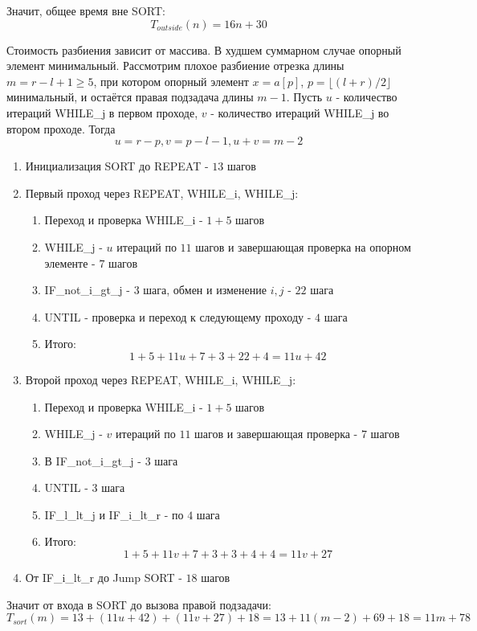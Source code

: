 \documentclass[12pt]{article}
\begin{document}
Значит, общее время вне SORT:
\[
    T_{outside}(n)=16n+30
\]

Стоимость разбиения зависит от массива.
В худшем суммарном случае опорный элемент минимальный. 
Рассмотрим плохое разбиение отрезка длины $m=r-l+1\geq5$, при котором
опорный элемент $x=a[p]$, $p=\lfloor(l+r)/2\rfloor$ минимальный, 
и остаётся правая подзадача длины $m-1$. Пусть $u$ - количество итераций WHILE\_j в первом проходе, $v$ - количество итераций WHILE\_j во втором проходе. Тогда
\[
    u=r-p, v=p-l-1, u+v=m-2
\]

\begin{enumerate}
    \item Инициализация SORT до REPEAT - $13$ шагов
    \item Первый проход через REPEAT, WHILE\_i,
    WHILE\_j: 
    \begin{enumerate}
        \item Переход и проверка WHILE\_i - $1+5$ шагов
        \item WHILE\_j - $u$ итераций по $11$ шагов и завершающая проверка
        на опорном элементе - $7$ шагов
        \item IF\_not\_i\_gt\_j - $3$ шага, обмен и изменение $i,j$ - $22$ шага
        \item UNTIL - проверка и переход к следующему проходу - $4$ шага
        \item Итого:
        \[
        1+5+11u+7+3+22+4=11u+42
        \]
    \end{enumerate}
    \item Второй проход через REPEAT, WHILE\_i,
    WHILE\_j:
    \begin{enumerate}
        \item Переход и проверка WHILE\_i - $1+5$ шагов
        \item WHILE\_j - $v$ итераций по $11$ шагов и завершающая проверка
        - $7$ шагов
        \item В IF\_not\_i\_gt\_j - $3$ шага
        \item UNTIL - $3$ шага
        \item IF\_l\_lt\_j и IF\_i\_lt\_r - по $4$
        шага
        \item Итого:
        \[
        1+5+11v+7+3+3+4+4=11v+27
        \]
    \end{enumerate}
    \item От IF\_i\_lt\_r до Jump SORT - $18$ шагов
\end{enumerate}

Значит от входа в SORT до вызова правой подзадачи:
\[
    T_{sort}(m)
    =13+(11u+42)+(11v+27)+18
    =13+11(m-2)+69+18
    =11m+78
\]
\end{document}
